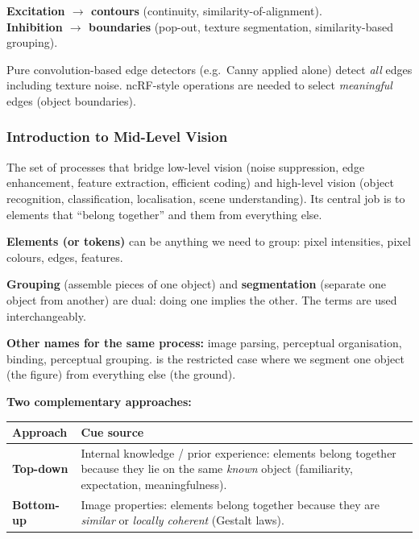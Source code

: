 \begin{tipbox}
\textbf{Excitation $\rightarrow$ contours} (continuity, similarity-of-alignment).\\
\textbf{Inhibition $\rightarrow$ boundaries} (pop-out, texture segmentation, similarity-based grouping).
\end{tipbox}

Pure convolution-based edge detectors (e.g.\ Canny applied alone) detect \emph{all} edges including texture noise. ncRF-style operations are needed to select \emph{meaningful} edges (object boundaries).

\bigseparator

\subsubsection{Introduction to Mid-Level Vision}

\begin{defbox}
The set of processes that bridge low-level vision (noise suppression, edge enhancement, feature extraction, efficient coding) and high-level vision (object recognition, classification, localisation, scene understanding). Its central job is to  elements that ``belong together'' and  them from everything else.
\end{defbox}

\textbf{Elements (or tokens)} can be anything we need to group: pixel intensities, pixel colours, edges, features.

\begin{thmbox}
\textbf{Grouping} (assemble pieces of one object) and \textbf{segmentation} (separate one object from another) are dual: doing one implies the other. The terms are used interchangeably.
\end{thmbox}

\textbf{Other names for the same process:}
image parsing, perceptual organisation, binding, perceptual grouping.  is the restricted case where we segment one object (the figure) from everything else (the ground).

\separator

\textbf{Two complementary approaches:}

\begin{center}
\renewcommand{\arraystretch}{1.3}
\begin{tabular}{@{} l p{10cm} @{}}
\toprule
\textbf{Approach} & \textbf{Cue source} \\
\midrule
\textbf{Top-down} & Internal knowledge / prior experience: elements belong together because they lie on the same \emph{known} object (familiarity, expectation, meaningfulness). \\
\textbf{Bottom-up} & Image properties: elements belong together because they are \emph{similar} or \emph{locally coherent} (Gestalt laws). \\
\bottomrule
\end{tabular}
\end{center}

